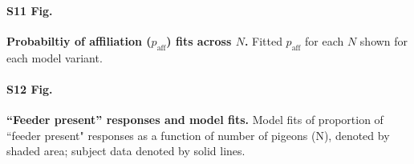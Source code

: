 \documentclass{article}
\begin{document}
\paragraph*{S11 Fig.}
\label{S11_Fig}
{\bf Probabiltiy of affiliation ($p_{\text{aff}}$) fits across $N$. }Fitted $p_{\text{aff}}$ for each $N$ shown for each model variant.

\paragraph*{S12 Fig.}
\label{S12_Fig}
{\bf ``Feeder present'' responses and model fits. }Model fits of proportion of ``feeder present" responses as a function of number of pigeons (N), denoted by shaded area; subject data denoted by solid lines.
\end{document}

